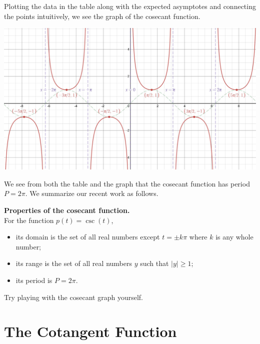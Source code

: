 \documentclass[nooutcomes, noauthor]{ximera}
\begin{document}
Plotting the data in the table along with the expected asymptotes and connecting the points intuitively, we see the graph of the cosecant function.

\begin{image}
\includegraphics[width=\textwidth]{cosecant.jpg}
\end{image}

We see from both the table and the graph that the cosecant function has period \(P = 2\pi\).  We summarize our recent work as follows.

\begin{callout}
\textbf{Properties of the cosecant function.}\\
For the function \(p(t) = \csc(t)\),
\begin{itemize}[label=\textbullet]
\item
its domain is the set of all real numbers except \(t = \pm k\pi\) where \(k\) is any whole number;%
\item
its range is the set of all real numbers \(y\) such that \(|y| \ge 1\);%
\item
its period is \(P = 2\pi\).%
\end{itemize}
\end{callout}

Try playing with the cosecant graph yourself.

\begin{center}  
\end{center} 


\section{The Cotangent Function}
\end{document}
